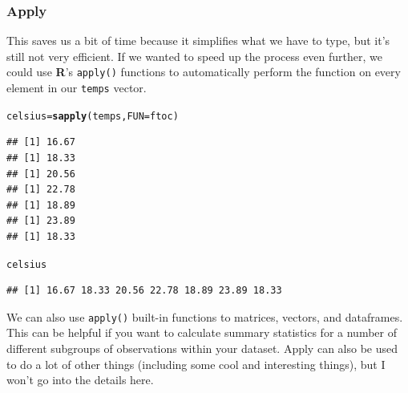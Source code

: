 \documentclass[12pt]{article}\usepackage[]{graphicx}\usepackage[]{color}
\makeatletter
\newcommand{\hlstd}[1]{\textcolor[rgb]{0.345,0.345,0.345}{#1}}%
\newcommand{\hlkwb}[1]{\textcolor[rgb]{0.69,0.353,0.396}{#1}}%
\newcommand{\hlkwc}[1]{\textcolor[rgb]{0.333,0.667,0.333}{#1}}%
\newcommand{\hlkwd}[1]{\textcolor[rgb]{0.737,0.353,0.396}{\textbf{#1}}}%
\newenvironment{kframe}{%
 \def\at@end@of@kframe{}%
 \ifinner\ifhmode%
  \def\at@end@of@kframe{\end{minipage}}%
  \begin{minipage}{\columnwidth}%
 \fi\fi%
 \def\FrameCommand##1{\hskip\@totalleftmargin \hskip-\fboxsep
 \colorbox{shadecolor}{##1}\hskip-\fboxsep
     \hskip-\linewidth \hskip-\@totalleftmargin \hskip\columnwidth}%
 \MakeFramed {\advance\hsize-\width
   \@totalleftmargin\z@ \linewidth\hsize
   \@setminipage}}%
 {\par\unskip\endMakeFramed%
 \at@end@of@kframe}
\newenvironment{knitrout}{}{} %
\makeatother
\begin{document}
\subsubsection{Apply}
This saves us a bit of time because it simplifies what we have to type, but it's still not very efficient. If we wanted to speed up the process even further, we could use \textbf{R}'s \verb|apply()| functions to automatically perform the function on every element in our \verb|temps| vector.
\begin{knitrout}
\color{fgcolor}\begin{kframe}
\begin{alltt}
\hlstd{celsius} \hlkwb{=} \hlkwd{sapply}\hlstd{(temps,} \hlkwc{FUN} \hlstd{= ftoc)}
\end{alltt}
\begin{verbatim}
## [1] 16.67
## [1] 18.33
## [1] 20.56
## [1] 22.78
## [1] 18.89
## [1] 23.89
## [1] 18.33
\end{verbatim}
\begin{alltt}
\hlstd{celsius}
\end{alltt}
\begin{verbatim}
## [1] 16.67 18.33 20.56 22.78 18.89 23.89 18.33
\end{verbatim}
\end{kframe}
\end{knitrout}

We can also use \verb|apply()| built-in functions to matrices, vectors, and dataframes. This can be helpful if you want to calculate summary statistics for a number of different subgroups of observations within your dataset. Apply can also be used to do a lot of other things (including some cool and interesting things), but I won't go into the details here.
\end{document}
